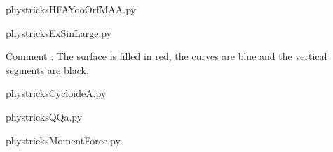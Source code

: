     

    \clearpage
    


    \newcommand{\CaptionFigHFAYooOrfMAA}{<+Type your caption here+>}
    \begin{center}
        
    \end{center}
    phystricksHFAYooOrfMAA.py

    

    \clearpage
    


    \newcommand{\CaptionFigExSinLarge}{<+Type your caption here+>}
    \begin{center}
        
    \end{center}
    phystricksExSinLarge.py

    Comment : The surface is filled in red, the curves are blue and the vertical segments are black.

    \clearpage
    


    \newcommand{\CaptionFigCycloideA}{<+Type your caption here+>}
    \begin{center}
        
    \end{center}
    phystricksCycloideA.py

    

    \clearpage
    


    \newcommand{\CaptionFigQQa}{<+Type your caption here+>}
    \begin{center}
        
    \end{center}
    phystricksQQa.py

    

    \clearpage
    


    \newcommand{\CaptionFigMomentForce}{<+Type your caption here+>}
    \begin{center}
        
    \end{center}
    phystricksMomentForce.py

    

    \clearpage
    

